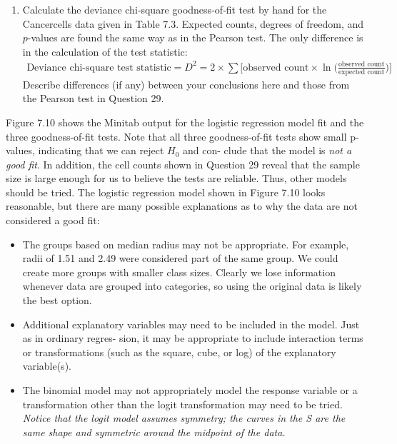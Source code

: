 \documentclass[
]{report}
\providecommand{\tightlist}{%
  \setlength{\itemsep}{0pt}\setlength{\parskip}{0pt}}
\begin{document}
\begin{enumerate}
\def\labelenumi{\arabic{enumi}.}
\setcounter{enumi}{29}
\tightlist
\item
  Calculate the deviance chi‐square goodness‐of‐fit test by hand for the Cancercells data given in Table 7.3. Expected counts, degrees of freedom, and \(p\)-values are found the same way as in the Pearson test. The only difference is in the calculation of the test statistic:\\
  \begin{align}
     \text{Deviance chi-square test statistic} = D^2 = 2 \times \sum \biggl[\text{observed count} \times \ln\bigl(\frac{\text{observed count}}{\text{expected count}}\bigr)\biggr]
     \tag{7.26}
     \end{align}
  Describe differences (if any) between your conclusions here and those from the Pearson test in Question 29.
\end{enumerate}

Figure 7.10 shows the Minitab output for the logistic regression model fit and the three goodness-of-fit tests.
Note that all three goodness-of-fit tests show small p-values, indicating that we can reject \(H_0\) and con-
clude that the model is \emph{not a good fit}. In addition, the cell counts shown in Question 29 reveal that the sample
size is large enough for us to believe the tests are reliable. Thus, other models should be tried. The logistic
regression model shown in Figure 7.10 looks reasonable, but there are many possible explanations as to why
the data are not considered a good fit:

\begin{itemize}
\item
  The groups based on median radius may not be appropriate. For example, radii of 1.51 and 2.49 were
  considered part of the same group. We could create more groups with smaller class sizes. Clearly we lose
  information whenever data are grouped into categories, so using the original data is likely the best option.
\item
  Additional explanatory variables may need to be included in the model. Just as in ordinary regres-
  sion, it may be appropriate to include interaction terms or transformations (such as the square, cube,
  or log) of the explanatory variable(s).
\item
  The binomial model may not appropriately model the response variable or a transformation other
  than the logit transformation may need to be tried. \emph{Notice that the logit model assumes symmetry; the curves in the S are the same shape and symmetric around the midpoint of the data.}
\end{itemize}
\end{document}
